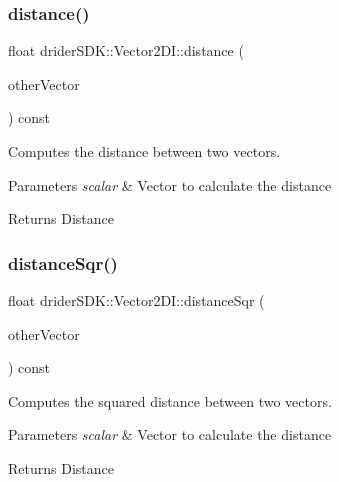 \subsubsection{\texorpdfstring{distance()}{distance()}}
{\footnotesize\ttfamily float drider\+S\+D\+K\+::\+Vector2\+D\+I\+::distance (\begin{DoxyParamCaption}\item[{const \hyperlink{classdrider_s_d_k_1_1_vector2_d_i}{Vector2\+DI} \&}]{other\+Vector }\end{DoxyParamCaption}) const}

Computes the distance between two vectors.


\begin{DoxyParams}{Parameters}
{\em scalar} & Vector to calculate the distance\\
\hline
\end{DoxyParams}
\begin{DoxyReturn}{Returns}
Distance 
\end{DoxyReturn}
\mbox{\label{classdrider_s_d_k_1_1_vector2_d_i_adaee7a32b75dfde110e6a825c4fbc656}} 
\subsubsection{\texorpdfstring{distance\+Sqr()}{distanceSqr()}}
{\footnotesize\ttfamily float drider\+S\+D\+K\+::\+Vector2\+D\+I\+::distance\+Sqr (\begin{DoxyParamCaption}\item[{const \hyperlink{classdrider_s_d_k_1_1_vector2_d_i}{Vector2\+DI} \&}]{other\+Vector }\end{DoxyParamCaption}) const}

Computes the squared distance between two vectors.


\begin{DoxyParams}{Parameters}
{\em scalar} & Vector to calculate the distance\\
\hline
\end{DoxyParams}
\begin{DoxyReturn}{Returns}
Distance 
\end{DoxyReturn}
\mbox{\label{classdrider_s_d_k_1_1_vector2_d_i_a84ebc56e4ad5fb4f6452b658af317e16}} 
